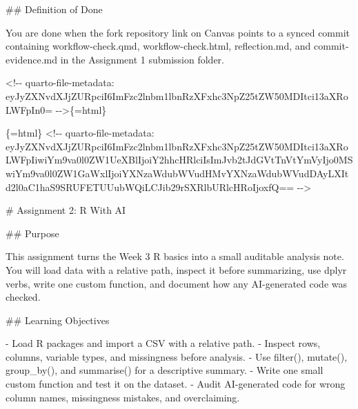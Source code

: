 \documentclass[
  letterpaper,
  DIV=11,
  numbers=noendperiod,
  oneside]{scrreprt}
\newenvironment{Shaded}{\begin{snugshade}}{\end{snugshade}}
\newcommand{\FunctionTok}[1]{\textcolor[rgb]{0.28,0.35,0.67}{#1}}
\newcommand{\InformationTok}[1]{\textcolor[rgb]{0.37,0.37,0.37}{#1}}
\newcommand{\NormalTok}[1]{\textcolor[rgb]{0.00,0.23,0.31}{#1}}
\newcommand{\SpecialStringTok}[1]{\textcolor[rgb]{0.13,0.47,0.30}{#1}}
\begin{document}
\begin{Shaded}
\begin{Highlighting}[numbers=left,,]
\FunctionTok{\#\# Definition of Done}

\NormalTok{You are done when the fork repository link on Canvas points to a synced commit containing }\InformationTok{\textasciigrave{}workflow{-}check.qmd\textasciigrave{}}\NormalTok{, }\InformationTok{\textasciigrave{}workflow{-}check.html\textasciigrave{}}\NormalTok{, }\InformationTok{\textasciigrave{}reflection.md\textasciigrave{}}\NormalTok{, and }\InformationTok{\textasciigrave{}commit{-}evidence.md\textasciigrave{}}\NormalTok{ in the Assignment 1 submission folder.}


\InformationTok{\textasciigrave{}\textless{}!{-}{-} quarto{-}file{-}metadata: eyJyZXNvdXJjZURpciI6ImFzc2lnbm1lbnRzXFxhc3NpZ25tZW50MDItci13aXRoLWFpIn0= {-}{-}\textgreater{}\textasciigrave{}}\NormalTok{\{=html\}}

\InformationTok{\textasciigrave{}\textasciigrave{}\textasciigrave{}\{=html\}}
\InformationTok{\textless{}!{-}{-} quarto{-}file{-}metadata: eyJyZXNvdXJjZURpciI6ImFzc2lnbm1lbnRzXFxhc3NpZ25tZW50MDItci13aXRoLWFpIiwiYm9va0l0ZW1UeXBlIjoiY2hhcHRlciIsImJvb2tJdGVtTnVtYmVyIjo0MSwiYm9va0l0ZW1GaWxlIjoiYXNzaWdubWVudHMvYXNzaWdubWVudDAyLXItd2l0aC1haS9SRUFETUUubWQiLCJib29rSXRlbURlcHRoIjoxfQ== {-}{-}\textgreater{}}
\InformationTok{\textasciigrave{}\textasciigrave{}\textasciigrave{}}

\FunctionTok{\# Assignment 2: R With AI }


\FunctionTok{\#\# Purpose}

\NormalTok{This assignment turns the Week 3 R basics into a small auditable analysis note. You will load data with a relative path, inspect it before summarizing, use }\InformationTok{\textasciigrave{}dplyr\textasciigrave{}}\NormalTok{ verbs, write one custom function, and document how any AI{-}generated code was checked.}

\FunctionTok{\#\# Learning Objectives}

\SpecialStringTok{{-} }\NormalTok{Load R packages and import a CSV with a relative path.}
\SpecialStringTok{{-} }\NormalTok{Inspect rows, columns, variable types, and missingness before analysis.}
\SpecialStringTok{{-} }\NormalTok{Use }\InformationTok{\textasciigrave{}filter()\textasciigrave{}}\NormalTok{, }\InformationTok{\textasciigrave{}mutate()\textasciigrave{}}\NormalTok{, }\InformationTok{\textasciigrave{}group\_by()\textasciigrave{}}\NormalTok{, and }\InformationTok{\textasciigrave{}summarise()\textasciigrave{}}\NormalTok{ for a descriptive summary.}
\SpecialStringTok{{-} }\NormalTok{Write one small custom function and test it on the dataset.}
\SpecialStringTok{{-} }\NormalTok{Audit AI{-}generated code for wrong column names, missingness mistakes, and overclaiming.}


\end{Highlighting}
\end{Shaded}
\end{document}
